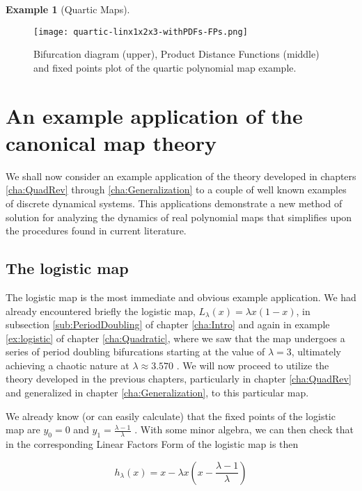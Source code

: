 \documentclass[10pt,twoside,titlepage]{book}
\numberwithin{equation}{chapter}
\numberwithin{figure}{chapter}
\numberwithin{table}{chapter}
\theoremstyle{plain}%
\theoremstyle{definition}
\newtheorem{example}{Example}[chapter]
\theoremstyle{remark}
\begin{document}
\begin{example}[Quartic Maps]
	\begin{figure}
		\centering
		\texttt{[image: quartic-linx1x2x3-withPDFs-FPs.png]}
		\caption{Bifurcation diagram (upper), Product Distance Functions (middle) and fixed points plot of the quartic polynomial map example.}
		\label{fig:CPM-Quartic}
	\end{figure}
	
\end{example}

\FloatBarrier
\chapter{An example application of the canonical map theory}
\label{cha:Applications}

We shall now consider an example application of the theory developed in chapters \ref{cha:QuadRev} through \ref{cha:Generalization} to a couple of well known examples of discrete dynamical systems. This applications demonstrate a new method of solution for analyzing the dynamics of real polynomial maps that simplifies upon the procedures found in current literature.

\section{The logistic map}

The logistic map is the most immediate and obvious example application. We had already encountered briefly the logistic map, $L_{\lambda}(x)=\lambda x(1-x)$, in subsection \ref{sub:PeriodDoubling} of chapter \ref{cha:Intro} and again in example \ref{ex:logistic} of chapter \ref{cha:Quadratic}, where we saw that the map undergoes a series of period doubling bifurcations starting at the value of $\lambda=3$, ultimately achieving a chaotic nature at $\lambda\approx 3.570$ \cite[p. 47]{Elaydi2008}. We will now proceed to utilize the theory developed in the previous chapters, particularly in chapter \ref{cha:QuadRev} and generalized in chapter \ref{cha:Generalization}, to this particular map.

We already know (or can easily calculate) that the fixed points of the logistic map are $y_0=0$ and $y_1=\frac{\lambda-1}{\lambda}$ \cite[p. 43]{Elaydi2008}. With some minor algebra, we can then check that in the corresponding Linear Factors Form of the logistic map is then

\begin{equation}
	h_\lambda(x)= x - \lambda x \left(x - \frac{\lambda-1}{\lambda}\right)
\end{equation}
\end{document}

